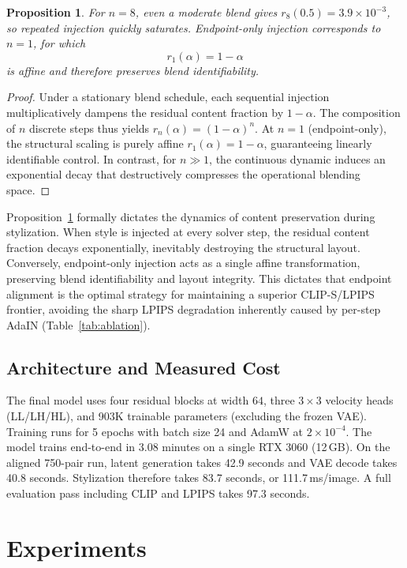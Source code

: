 \documentclass[letterpaper]{article}
\newtheorem{proposition}{Proposition}
\begin{document}
\begin{proposition}
\label{prop:eota}
For $n=8$, even a moderate blend gives $r_8(0.5)=3.9\times10^{-3}$, so repeated injection quickly saturates.
Endpoint-only injection corresponds to $n=1$, for which
\begin{equation}
r_1(\alpha)=1-\alpha
\end{equation}
is affine and therefore preserves blend identifiability.
\end{proposition}
\begin{proof}
Under a stationary blend schedule, each sequential injection multiplicatively dampens the residual content fraction by $1-\alpha$. The composition of $n$ discrete steps thus yields $r_n(\alpha)=(1-\alpha)^n$. At $n=1$ (endpoint-only), the structural scaling is purely affine $r_1(\alpha)=1-\alpha$, guaranteeing linearly identifiable control. In contrast, for $n\gg 1$, the continuous dynamic induces an exponential decay that destructively compresses the operational blending space.
\end{proof}

Proposition~\ref{prop:eota} formally dictates the dynamics of content preservation during stylization.
When style is injected at every solver step, the residual content fraction decays exponentially, inevitably destroying the structural layout.
Conversely, endpoint-only injection acts as a single affine transformation, preserving blend identifiability and layout integrity.
This dictates that endpoint alignment is the optimal strategy for maintaining a superior CLIP-S/LPIPS frontier, avoiding the sharp LPIPS degradation inherently caused by per-step AdaIN (Table~\ref{tab:ablation}).

\subsection{Architecture and Measured Cost}
\label{sec:arch}

The final model uses four residual blocks at width $64$, three $3\times3$ velocity heads (LL/LH/HL), and 903K trainable parameters (excluding the frozen VAE).
Training runs for 5 epochs with batch size 24 and AdamW at $2\times10^{-4}$.
The model trains end-to-end in 3.08 minutes on a single RTX 3060 (12\,GB).
On the aligned 750-pair run, latent generation takes 42.9 seconds and VAE decode takes 40.8 seconds.
Stylization therefore takes 83.7 seconds, or 111.7\,ms/image.
A full evaluation pass including CLIP and LPIPS takes 97.3 seconds.

\section{Experiments}
\label{sec:exp}
\end{document}

